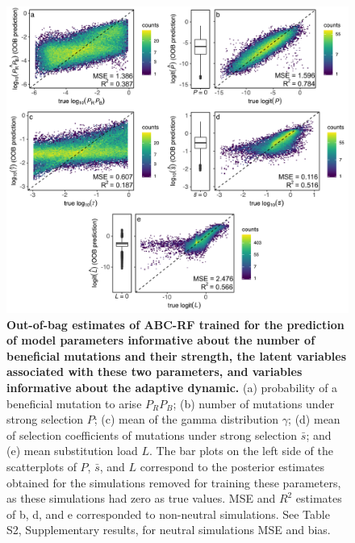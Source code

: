 \documentclass[a4paper, 12pt]{article}
\begin{document}
\begin{figure}[ht]
 \centering
 \includegraphics[width=1\textwidth]{Figures/FigureS2_oob_plots_selection.pdf}
 \small\caption{\textbf{Out-of-bag estimates of ABC-RF trained for the prediction of model parameters informative about the number of beneficial mutations and their strength, the latent variables associated with these two parameters, and variables informative about the adaptive dynamic.} (a) probability of a beneficial mutation to arise $P_RP_B$; (b) number of mutations under strong selection $P$; (c) mean of the gamma distribution $\gamma$; (d) mean of selection coefficients of mutations under strong selection $\bar{s}$; and (e) mean substitution load $L$. The bar plots on the left side of the scatterplots of $P$, $\bar{s}$, and $L$ correspond to the posterior estimates obtained for the simulations removed for training these parameters, as these simulations had zero as true values. MSE and $R^2$ estimates of b, d, and e corresponded to non-neutral simulations. See Table S2, Supplementary results, for neutral simulations MSE and bias.}
 \label{fig:supple_oob_sel}
\end{figure}
\end{document}
